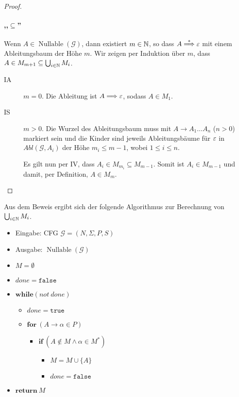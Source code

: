 \begin{proof}
  
  \paragraph{,,$\subseteq$''}
  Wenn $A \in \operatorname{Nullable}(\mathcal{G})$, dann existiert $m
  \in \mathbb{N}$, so dass $A \stackrel{*}{\==>} \Eps$ mit einem
  Ableitungsbaum der Höhe $m$.
  Wir zeigen per Induktion über $m$, dass $A \in M_{m+1} \subseteq \bigcup_{i \in \mathbb{N}} M_i$.
  \begin{description}
  \item[IA] $m = 0$. Die Ableitung ist $A \==> \Eps$, sodass $A\in M_1$.
  \item[IS] $m > 0$.
    Die Wurzel des Ableitungsbaum muss mit $A \to A_1\ldots A_n$ ($n>0$)
    markiert sein und die Kinder sind jeweils Ableitungsbäume für
    $\varepsilon$ in  $Abl(\mathcal{G}, A_i)$ der Höhe $m_i \le m-1$, wobei $1 \le i \le n$.
    
    Es gilt nun per IV, dass $A_i \in M_{m_i} \subseteq M_{m-1}$.
    Somit ist $A_i \in M_{m-1}$ und damit, per Definition, $A \in M_m$.
  \end{description}
\end{proof}
Aus dem Beweis ergibt sich der folgende Algorithmus zur Berechnung von $\bigcup_{i \in \mathbb{N}} M_i$.
\begin{itemize}
\item Eingabe: CFG $\mathcal{G} = (N, \Sigma, P, S)$
\item Ausgabe: $\operatorname{Nullable}(\mathcal{G})$
\item[] $M = \emptyset$
\item[] $\mathit{done} = \mathtt{false}$
\item[] $\mathbf{while} (\mathit{not}~\mathit{done})$
  \begin{itemize}
  \item[] $\mathit{done} = \mathtt{true}$
  \item[] $\mathbf{for}~(A \to \alpha \in P)$
    \begin{itemize}
    \item[] $\mathbf{if}~(A \not \in M \land \alpha \in M^*)$
      \begin{itemize}
      \item[] $M = M \cup \{A \}$
      \item[] $\mathit{done} = \mathtt{false}$
      \end{itemize}
    \end{itemize}
  \end{itemize}
\item[] $\mathbf{return}~M$
\end{itemize}
